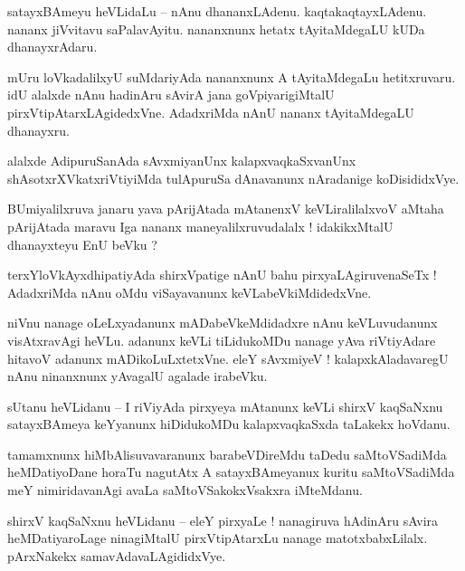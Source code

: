 \documentclass{article}
\begin{document}
\begin{mn}%
satayxBAmeyu heVLidaLu -- nAnu dhananxLAdenu. kaqtakaqtayxLAdenu. nananx jiVvitavu saPalavAyitu. 
nananxnunx hetatx tAyitaMdegaLU kUDa dhanayxrAdaru.
\end{mn}

\begin{mn}%
mUru loVkadalilxyU suMdariyAda nananxnunx A tAyitaMdegaLu hetitxruvaru. idU alalxde nAnu hadinAru 
sAvirA jana goVpiyarigiMtalU pirxVtipAtarxLAgidedxVne. AdadxriMda nAnU nananx tAyitaMdegaLU 
dhanayxru.
\end{mn}

\begin{mn}%
alalxde AdipuruSanAda sAvxmiyanUnx kalapxvaqkaSxvanUnx shAsotxrXVkatxriVtiyiMda tulApuruSa 
dAnavanunx nAradanige koDisididxVye.
\end{mn}

\begin{mn}%
BUmiyalilxruva janaru yava pArijAtada mAtanenxV keVLiralilalxvoV aMtaha pArijAtada maravu Iga 
nananx maneyalilxruvudalalx ! idakikxMtalU dhanayxteyu EnU beVku ?
\end{mn}

\begin{mn}%
terxYloVkAyxdhipatiyAda shirxVpatige nAnU bahu pirxyaLAgiruvenaSeTx ! AdadxriMda nAnu oMdu 
viSayavanunx keVLabeVkiMdidedxVne.
\end{mn}

\begin{mn}%
niVnu nanage oLeLxyadanunx mADabeVkeMdidadxre nAnu keVLuvudanunx visAtxravAgi heVLu. adanunx keVLi 
tiLidukoMDu nanage yAva riVtiyAdare hitavoV adanunx mADikoLuLxtetxVne. eleY sAvxmiyeV ! 
kalapxkAladavaregU nAnu ninanxnunx yAvagalU agalade irabeVku.
\end{mn}

\begin{mn}%
sUtanu heVLidanu -- I riViyAda pirxyeya mAtanunx keVLi shirxV kaqSaNxnu satayxBAmeya keYyanunx 
hiDidukoMDu kalapxvaqkaSxda taLakekx hoVdanu.
\end{mn}

\begin{mn}%
tamamxnunx hiMbAlisuvavaranunx barabeVDireMdu taDedu saMtoVSadiMda heMDatiyoDane horaTu nagutAtx A 
satayxBAmeyanux kuritu saMtoVSadiMda meY nimiridavanAgi avaLa saMtoVSakokxVsakxra iMteMdanu.
\end{mn}

\begin{mn}%
shirxV kaqSaNxnu heVLidanu -- eleY pirxyaLe ! nanagiruva hAdinAru sAvira heMDatiyaroLage 
ninagiMtalU pirxVtipAtarxLu nanage matotxbabxLilalx. pArxNakekx samavAdavaLAgididxVye.
\end{mn}
\end{document}

